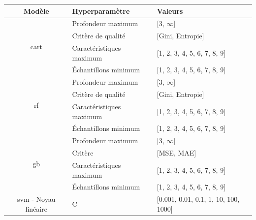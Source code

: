 \begin{table}[H]
    \centering
    \begin{tabular}{cll}
        \toprule
        \textbf{Modèle}                                 & \textbf{Hyperparamètre}   & \textbf{Valeurs}                          \\ \midrule
        \multirow{4}{*}{\gls{cart}}                     & Profondeur maximum        & [3, $\infty$]                             \\ \cmidrule{2-3} 
                                                        & Critère de qualité        & [Gini, Entropie]                          \\ \cmidrule{2-3}   
                                                        & Caractéristiques maximum  & [1, 2, 3, 4, 5, 6, 7, 8, 9]               \\ \cmidrule{2-3}   
                                                        & Échantillons minimum      & [1, 2, 3, 4, 5, 6, 7, 8, 9]               \\ \midrule 
        \multirow{4}{*}{\gls{rf}}                       & Profondeur maximum        & [3, $\infty$]                             \\ \cmidrule{2-3} 
                                                        & Critère de qualité        & [Gini, Entropie]                          \\ \cmidrule{2-3}   
                                                        & Caractéristiques maximum  & [1, 2, 3, 4, 5, 6, 7, 8, 9]               \\ \cmidrule{2-3}   
                                                        & Échantillons minimum      & [1, 2, 3, 4, 5, 6, 7, 8, 9]               \\ \midrule 
        \multirow{4}{*}{\gls{gb}}                       & Profondeur maximum        & [3, $\infty$]                             \\ \cmidrule{2-3}
                                                        & Critère                   & [MSE, MAE]                                \\ \cmidrule{2-3} 
                                                        & Caractéristiques maximum  & [1, 2, 3, 4, 5, 6, 7, 8, 9]               \\ \cmidrule{2-3}   
                                                        & Échantillons minimum      & [1, 2, 3, 4, 5, 6, 7, 8, 9]               \\ \midrule 
        \gls{svm} - Noyau linéaire                      & C                         & [0.001, 0.01, 0.1, 1, 10, 100, 1000]      \\ \midrule

\end{tabular}
\end{table}
